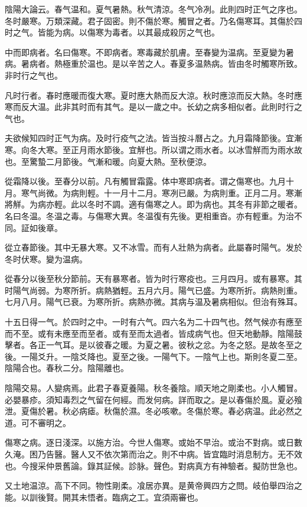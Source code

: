 \documentclass[12pt,twoside,UTF8,b5paper]{ctexbook}
\begin{document}
陰陽大論云。春气温和。夏气暑熱。秋气清涼。冬气冷冽。此則四时正气之序也。冬时嚴寒。万類深藏。君子固密。則不傷於寒。觸冒之者。乃名傷寒耳。其傷於四时之气。皆能为病。以傷寒为毒者。以其最成殺厉之气也。

中而即病者。名曰傷寒。不即病者。寒毒藏於肌膚。至春變为温病。至夏變为暑病。暑病者。熱極重於温也。是以辛苦之人。春夏多温熱病。皆由冬时觸寒所致。非时行之气也。

凡时行者。春时應暖而復大寒。夏时應大熱而反大涼。秋时應涼而反大熱。冬时應寒而反大温。此非其时而有其气。是以一歲之中。长幼之病多相似者。此則时行之气也。

夫欲候知四时正气为病。及时行疫气之法。皆当按斗曆占之。九月霜降節後。宜漸寒。向冬大寒。至正月雨水節後。宜觧也。所以谓之雨水者。以冰雪觧而为雨水故也。至驚蟄二月節後。气漸和暖。向夏大熱。至秋便涼。

從霜降以後。至春分以前。凡有觸冒霜露。体中寒即病者。谓之傷寒也。九月十月。寒气尚微。为病則輕。十一月十二月。寒冽已嚴。为病則重。正月二月。寒漸將觧。为病亦輕。此以冬时不調。適有傷寒之人。即为病也。其冬有非節之暖者。名曰冬温。冬温之毒。与傷寒大異。冬温復有先後。更相重沓。亦有輕重。为治不同。証如後章。

從立春節後。其中无暴大寒。又不冰雪。而有人壯熱为病者。此屬春时陽气。发於冬时伏寒。變为温病。

從春分以後至秋分節前。天有暴寒者。皆为时行寒疫也。三月四月。或有暴寒。其时陽气尚弱。为寒所折。病熱猶輕。五月六月。陽气已盛。为寒所折。病熱則重。七月八月。陽气已衰。为寒所折。病熱亦微。其病与温及暑病相似。但治有殊耳。

十五日得一气。於四时之中。一时有六气。四六名为二十四气也。然气候亦有應至而不至。或有未應至而至者。或有至而太過者。皆成病气也。但天地動靜。陰陽鼓擊者。各正一气耳。是以彼春之暖。为夏之暑。彼秋之忿。为冬之怒。是故冬至之後。一陽爻升。一陰爻降也。夏至之後。一陽气下。一陰气上也。斯則冬夏二至。陰陽合也。春秋二分。陰陽離也。

陰陽交易。人變病焉。此君子春夏養陽。秋冬養陰。順天地之剛柔也。小人觸冒。必嬰暴疹。須知毒烈之气留在何經。而发何病。詳而取之。是以春傷於風。夏必飱泄。夏傷於暑。秋必病瘧。秋傷於濕。冬必咳嗽。冬傷於寒。春必病温。此必然之道。可不審明之。

傷寒之病。逐日淺深。以施方治。今世人傷寒。或始不早治。或治不對病。或日數久淹。困乃告醫。醫人又不依次第而治之。則不中病。皆宜臨时消息制方。无不效也。今搜采仲景舊論。錄其証候。診脉。聲色。對病真方有神驗者。擬防世急也。

又土地温涼。高下不同。物性剛柔。飡居亦異。是黄帝興四方之問。岐伯舉四治之能。以訓後賢。開其未悟者。臨病之工。宜須兩審也。
\end{document}
